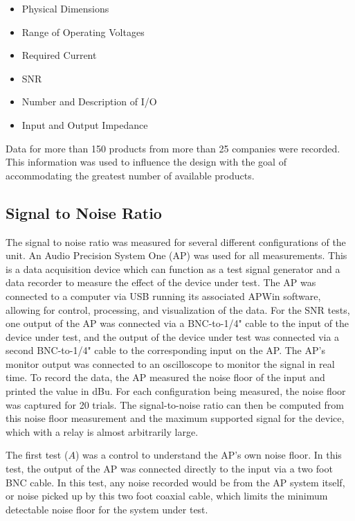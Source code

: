 \documentclass{article}
\begin{document}
	\begin{itemize}
		\item Physical Dimensions
		\item Range of Operating Voltages
		\item Required Current
		\item SNR
		\item Number and Description of I/O
		\item Input and Output Impedance
	\end{itemize}

	Data for more than 150 products from more than 25 companies were recorded.  This information was used to influence the design with the goal of accommodating the greatest number of available products.

	\subsection{Signal to Noise Ratio}
	The signal to noise ratio was measured for several different configurations of the unit.  An Audio Precision System One (AP) was used for all measurements.  This is a data acquisition device which can function as a test signal generator and a data recorder to measure the effect of the device under test.  The AP was connected to a computer via USB running its associated APWin software, allowing for control, processing, and visualization of the data.  For the SNR tests, one output of the AP was connected via a BNC-to-1/4" cable to the input of the device under test, and the output of the device under test was connected via a second BNC-to-1/4" cable to the corresponding input on the AP.  The AP's monitor output was connected to an oscilloscope to monitor the signal in real time.  To record the data, the AP measured the noise floor of the input and printed the value in dBu.  For each configuration being measured, the noise floor was captured for 20 trials.  The signal-to-noise ratio can then be computed from this noise floor measurement and the maximum supported signal for the device, which with a relay is almost arbitrarily large.

	The first test ($A$) was a control to understand the AP's own noise floor.  In this test, the output of the AP was connected directly to the input via a two foot BNC cable.  In this test, any noise recorded would be from the AP system itself, or noise picked up by this two foot coaxial cable, which limits the minimum detectable noise floor for the system under test.
\end{document}
